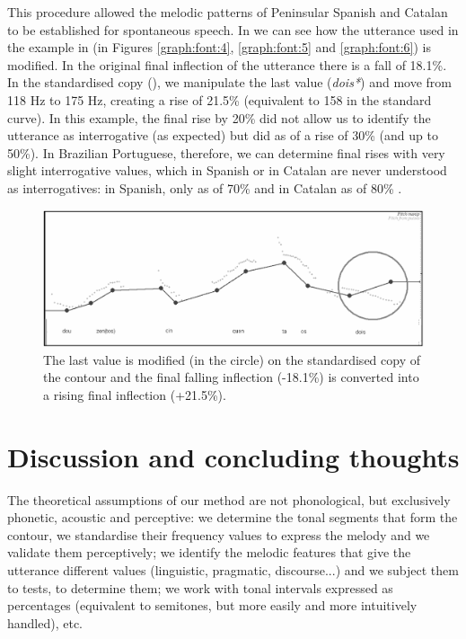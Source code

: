\documentclass[output=paper]{langscibook}
\begin{document}
This procedure allowed the melodic patterns of Peninsular Spanish \citep{CanteroSerena.2007}  and Catalan \citep{FontRotches.2007} to be established for spontaneous speech. In  we can see how the utterance used in the example in  (in Figures \ref{graph:font:4}, \ref{graph:font:5} and \ref{graph:font:6}) is modified. In the original final inflection of the utterance there is a fall of 18.1\%. In the standardised copy (), we manipulate the last value (\textit{dois*}) and move from 118 Hz to 175 Hz, creating a rise of 21.5\% (equivalent to 158 in the standard curve). In this example, the final rise by 20\% did not allow us to identify the utterance as interrogative (as expected) but did as of a rise of 30\% (and up to 50\%). In Brazilian Portuguese, therefore, we can determine final rises with very slight interrogative values, which in Spanish or in Catalan are never understood as interrogatives: in Spanish, only as of 70\% and in Catalan as of 80\% \citep{CanteroSerena.2013}.

\begin{figure}
\includegraphics[width=\textwidth]{figures/FON-img12.PNG}
\caption{The last value is modified (in the circle) on the standardised copy of the contour and the final falling inflection (-18.1\%) is converted into a rising final inflection (+21.5\%).\label{graph:font:7}}
\end{figure}



\section{Discussion and concluding thoughts}
The theoretical assumptions of our method are not phonological, but exclusively phonetic, acoustic and perceptive: we determine the tonal segments that form the contour, we standardise their frequency values to express the melody and we validate them perceptively; we identify the melodic features that give the utterance different values (linguistic, pragmatic, discourse...) and we subject them to tests, to determine them; we work with tonal intervals expressed as percentages (equivalent to semitones, but more easily and more intuitively handled), etc.
\end{document}
